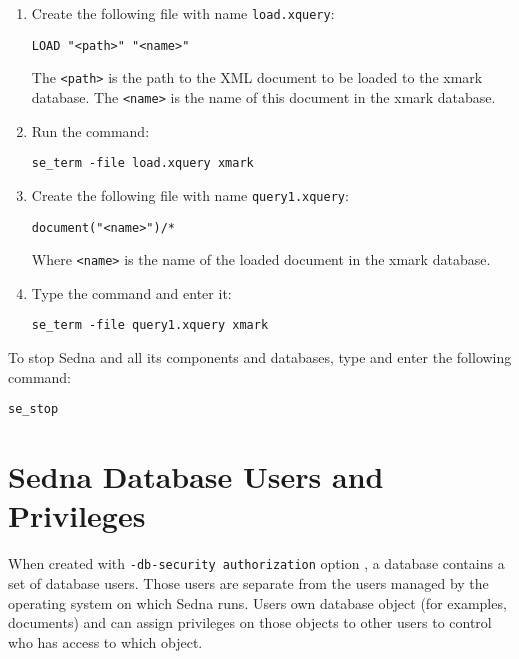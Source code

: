 \documentclass[a4paper,12pt]{article}
\begin{document}
\begin{enumerate}
\item Create the following file with name \verb!load.xquery!:

\begin{verbatim}
LOAD "<path>" "<name>"
\end{verbatim}

The \verb!<path>! is the path to the XML document to be loaded to the xmark database. The \verb!<name>! is the name of this document in the xmark database.

\item Run the command: 

\begin{verbatim}
se_term -file load.xquery xmark
\end{verbatim}

\item Create the following file with name \verb!query1.xquery!:

\begin{verbatim}
document("<name>")/*
\end{verbatim}

Where \verb!<name>! is the name of the loaded document in the xmark database.

\item Type the command and enter it:
\begin{verbatim}
se_term -file query1.xquery xmark
\end{verbatim}
\end{enumerate}

To stop Sedna and all its components and databases, type and enter the following command:

\begin{verbatim}
se_stop
\end{verbatim}



%
%
%
%
\section{Sedna Database Users and Privileges}

When created with \verb!-db-security authorization! option , a database contains a set of database users. Those users are separate from the users managed by the operating system on which Sedna runs. Users own database object (for examples, documents) and can assign privileges on those objects to other users to control who has access to which object. 
\end{document}
